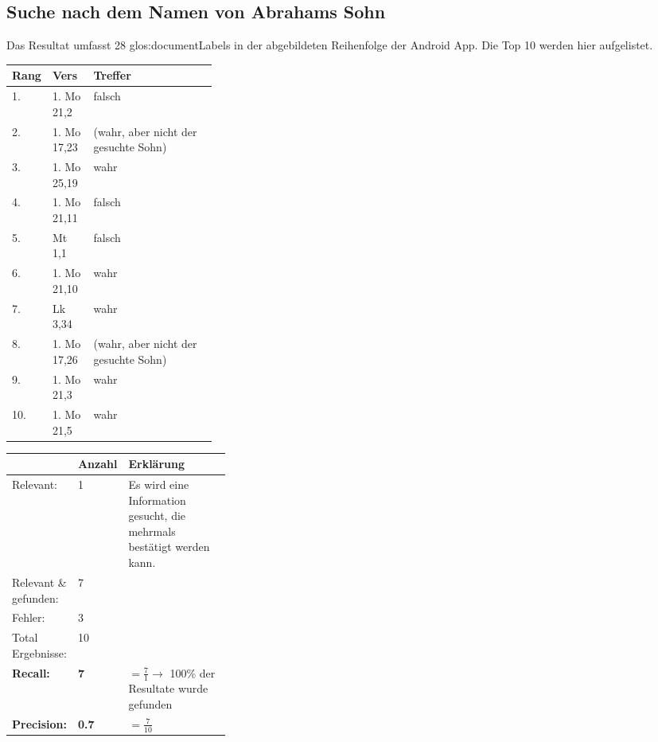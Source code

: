 
\subsection{Suche nach dem Namen von Abrahams Sohn}
Das Resultat umfasst 28 \glspl{glos:documentLabel} in der abgebildeten Reihenfolge der Android App.
Die Top 10 werden hier aufgelistet.
\begin{table}[H]
	\centering
	\small\renewcommand{\arraystretch}{1.4}
	\begin{tabularx}{0.9\textwidth}{ R{0.1\linewidth} | L{0.2\linewidth} | X }%
		\hline
		Rang & Vers & Treffer \\ \hline {}. & 1. Mo 21,2 & falsch\\
		2. & 1. Mo 17,23 & (wahr, aber nicht der gesuchte Sohn)\\
		3. & 1. Mo 25,19 & wahr\\
		4. & 1. Mo 21,11 & falsch\\
		5. & Mt 1,1 & falsch\\
		6. & 1. Mo 21,10 & wahr\\
		7. & Lk 3,34 & wahr\\
		8. & 1. Mo 17,26 & (wahr, aber nicht der gesuchte Sohn)\\
		9. & 1. Mo 21,3 & wahr\\
		10. & 1. Mo 21,5 & wahr\\
		\hline
	\end{tabularx}
\end{table}


\begin{table}[H]
	\centering
	\small\renewcommand{\arraystretch}{1.4}
	\begin{tabularx}{0.9\textwidth}{ L{0.22\linewidth} | L{0.1\linewidth} | X }%
		\hline
		& Anzahl & Erklärung \\ \hline \hline
		Relevant: & 1 & Es wird eine Information gesucht, die mehrmals bestätigt werden kann.\\
		Relevant \& gefunden: & 7 & \\
		Fehler: & 3 & \\
		Total Ergebnisse: & 10 & \\
		\hline
		\textbf{Recall:} & \textbf{7} & $= \frac{7}{1} \rightarrow$ 100\% der Resultate wurde gefunden\\
		\textbf{Precision:} & \textbf{0.7} & $= \frac{7}{10}$ \\
		\hline\hline
	\end{tabularx}
\end{table}

